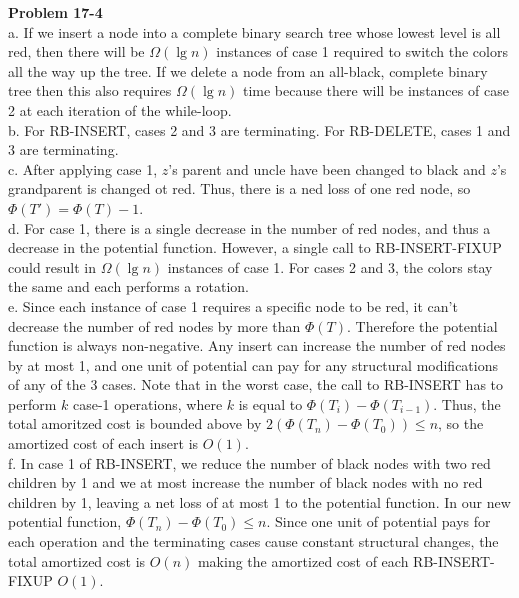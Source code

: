 \documentclass{article}
\begin{document}
\noindent\textbf{Problem 17-4}\\

a. If we insert a node into a complete binary search tree whose lowest level is all red, then there will be $\Omega(\lg n)$ instances of case 1 required to switch the colors all the way up the tree.  If we delete a node from an all-black, complete binary tree then this also requires $\Omega(\lg n)$ time because there will be instances of case 2 at each iteration of the while-loop. \\

b. For RB-INSERT, cases 2 and 3 are terminating.  For RB-DELETE, cases 1 and 3 are terminating. \\

c. After applying case 1, $z$'s parent and uncle have been changed to black and $z$'s grandparent is changed ot red.  Thus, there is a ned loss of one red node, so $\Phi(T') = \Phi(T) - 1$.\\

d. For case 1, there is a single decrease in the number of red nodes, and thus a decrease in the potential function.  However, a single call to RB-INSERT-FIXUP could result in $\Omega(\lg n)$ instances of case 1.  For cases 2 and 3, the colors stay the same and each performs a rotation.\\

e. Since each instance of case 1 requires a specific node to be red, it can't decrease the number of red nodes by more than $\Phi(T)$.  Therefore the potential function is always non-negative. Any insert can increase the number of red nodes by at most 1, and one unit of potential can pay for any structural modifications of any of the 3 cases.  Note that in the worst case, the call to RB-INSERT has to perform $k$ case-1 operations, where $k$ is equal to $\Phi(T_i) - \Phi(T_{i-1})$. Thus, the total amoritzed cost is bounded above by $2(\Phi(T_n) - \Phi(T_0)) \leq n$, so the amortized cost of each insert is $O(1)$. \\

f. In case 1 of RB-INSERT, we reduce the number of black nodes with two red children by 1 and we at most increase the number of black nodes with no red children by 1, leaving a net loss of at most 1 to the potential function. In our new potential function, $\Phi(T_n) - \Phi(T_0) \leq n$.  Since one unit of potential pays for each operation and the terminating cases cause constant structural changes, the total amortized cost is $O(n)$ making the amortized cost of each RB-INSERT-FIXUP $O(1)$. \\
\end{document}
